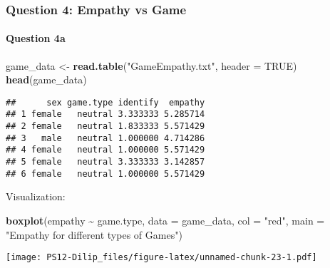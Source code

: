 \documentclass[
]{article}
\newenvironment{Shaded}{\begin{snugshade}}{\end{snugshade}}
\newcommand{\AttributeTok}[1]{\textcolor[rgb]{0.13,0.29,0.53}{#1}}
\newcommand{\CommentTok}[1]{\textcolor[rgb]{0.56,0.35,0.01}{\textit{#1}}}
\newcommand{\ConstantTok}[1]{\textcolor[rgb]{0.56,0.35,0.01}{#1}}
\newcommand{\FunctionTok}[1]{\textcolor[rgb]{0.13,0.29,0.53}{\textbf{#1}}}
\newcommand{\NormalTok}[1]{#1}
\newcommand{\OtherTok}[1]{\textcolor[rgb]{0.56,0.35,0.01}{#1}}
\newcommand{\SpecialCharTok}[1]{\textcolor[rgb]{0.81,0.36,0.00}{\textbf{#1}}}
\newcommand{\StringTok}[1]{\textcolor[rgb]{0.31,0.60,0.02}{#1}}
\begin{document}
\hypertarget{question-4-empathy-vs-game}{%
\subsubsection{Question 4: Empathy vs
Game}\label{question-4-empathy-vs-game}}

\hypertarget{question-4a}{%
\paragraph{Question 4a}\label{question-4a}}

\begin{Shaded}
\begin{Highlighting}[]
\NormalTok{game\_data }\OtherTok{\textless{}{-}} \FunctionTok{read.table}\NormalTok{(}\StringTok{"GameEmpathy.txt"}\NormalTok{, }\AttributeTok{header =} \ConstantTok{TRUE}\NormalTok{)}
\FunctionTok{head}\NormalTok{(game\_data)}
\end{Highlighting}
\end{Shaded}

\begin{verbatim}
##      sex game.type identify  empathy
## 1 female   neutral 3.333333 5.285714
## 2 female   neutral 1.833333 5.571429
## 3   male   neutral 1.000000 4.714286
## 4 female   neutral 1.000000 5.571429
## 5 female   neutral 3.333333 3.142857
## 6 female   neutral 1.000000 5.571429
\end{verbatim}

Visualization:

\begin{Shaded}
\begin{Highlighting}[]
\FunctionTok{boxplot}\NormalTok{(empathy }\SpecialCharTok{\textasciitilde{}}\NormalTok{ game.type, }\AttributeTok{data =}\NormalTok{ game\_data, }\AttributeTok{col =} \StringTok{"red"}\NormalTok{, }\AttributeTok{main =} \StringTok{"Empathy for different types of Games"}\NormalTok{)}
\end{Highlighting}
\end{Shaded}

\texttt{[image: PS12-Dilip\_files/figure-latex/unnamed-chunk-23-1.pdf]}

\begin{Shaded}
\end{Shaded}
\end{document}
